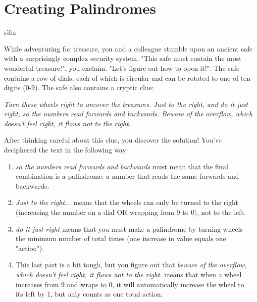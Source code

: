 \documentclass[11pt]{article}
\begin{document}
\section*{Creating Palindromes}

\begin{wrapfigure}{r}{3in}
\vspace{-10pt}
\vspace{-30pt}
\end{wrapfigure}

While adventuring for treasure, you and a colleague stumble upon an ancient safe with a surprisingly complex security system. "This safe must contain the most wonderful treasure!", you exclaim. "Let's figure out how to open it!". The safe contains a row of dials, each of which is circular and can be rotated to one of ten digits (0-9). The safe also contains a cryptic clue:

\emph{Turn these wheels right to uncover the treasures. Just to the right, and do it just right, so the numbers read forwards and backwards. Beware of the overflow, which doesn't feel right, it flows not to the right.}

After thinking careful about this clue, you discover the solution! You've deciphered the text in the following way:

\begin{enumerate}
\item \emph{so the numbers read forwards and backwards} must mean that the final combination is a palindrome: a number that reads the same forwards and backwards.
\item \emph{Just to the right...} means that the wheels can only be turned to the right (increasing the number on a dial OR wrapping from 9 to 0), not to the left.
\item \emph{do it just right} means that you must make a palindrome by turning wheels the minimum number of total times (one increase in value equals one "action").
\item This last part is a bit tough, but you figure out that \emph{beware of the overflow, which doesn't feel right, it flows not to the right.} means that when a wheel increases from 9 and wraps to 0, it will automatically increase the wheel to its left by 1, but only counts as one total action.
\end{enumerate}
\end{document}
